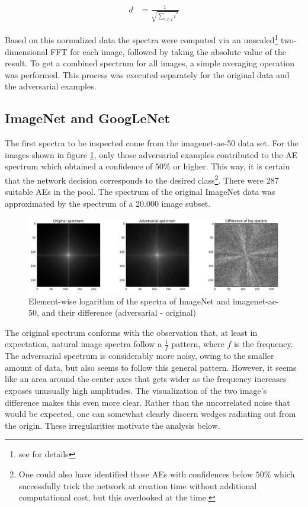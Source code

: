 \documentclass[11pt, a4paper]{article}
\begin{document}
\begin{align}
	d &= \frac{1}{\displaystyle \sqrt{\sum_{i \in I}{i^2}}} \label{eq:image-normalization}
\end{align}

Based on this normalized data the spectra were computed via an unscaled\footnote{see \cite{numpy-fft} for details} two-dimensional FFT for each image, followed by taking the absolute value of the result. To get a combined spectrum for all images, a simple averaging operation was performed. This process was executed separately for the original data and the adversarial examples.

\subsection{ImageNet and GoogLeNet}
The first spectra to be inspected come from the imagenet-ae-50 data set. For the images shown in figure \ref{fig:imagenet-ae-50-spectra}, only those adversarial examples contributed to the AE spectrum which obtained a confidence of $50\%$ or higher. This way, it is certain that the network decision corresponds to the desired class\footnote{One could also have identified those AEs with confidences below $50\%$ which successfully trick the network at creation time without additional computational cost, but this overlooked at the time.}. There were 287 suitable AEs in the pool. The spectrum of the original ImageNet data was approximated by the spectrum of a 20.000 image subset.

\begin{figure}[htb]
	\centering
	\includegraphics[width=\textwidth]{images/spectra/imagenet-ae-50-minconfidence-0dot5-maxorig-20000-spectra.png}
	\caption{Element-wise logarithm of the spectra of ImageNet and imagenet-ae-50, and their difference (adversarial - original)}
	\label{fig:imagenet-ae-50-spectra}
\end{figure}

The original spectrum conforms with the observation that, at least in expectation, natural image spectra follow a $\frac{1}{f}$ pattern, where $f$ is the frequency\cite{relations-between-natural-image-statistics-and-cortical-cells}. The adversarial spectrum is considerably more noisy, owing to the smaller amount of data, but also seems to follow this general pattern. However, it seems like an area around the center axes that gets wider as the frequency increases exposes unusually high amplitudes. The visualization of the two image's difference makes this even more clear. Rather than the uncorrelated noise that would be expected, one can somewhat clearly discern wedges radiating out from the origin. These irregularities motivate the analysis below.
\end{document}
